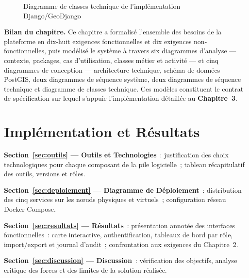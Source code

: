 \begin{figure}[H]
  \centering
  \caption{Diagramme de classes technique de l'implémentation Django/GeoDjango}
  \label{fig:diag-classes-tech}
\end{figure}

\medskip
\noindent\textbf{Bilan du chapitre.}
Ce chapitre a formalisé l'ensemble des besoins de la plateforme en
dix-huit exigences fonctionnelles et dix exigences non-fonctionnelles, puis
modélisé le système à travers six diagrammes d'analyse --- contexte,
packages, cas d'utilisation, classes métier et activité --- et cinq
diagrammes de conception --- architecture technique, schéma de données
PostGIS, deux diagrammes de séquence système, deux diagrammes de séquence
technique et diagramme de classes technique. Ces modèles constituent le
contrat de spécification sur lequel s'appuie l'implémentation détaillée au
\textbf{Chapitre~3}.

\clearpage

\chapter{Implémentation et Résultats}
\label{chap:implementation}

\begin{chapplan}
  \item \textbf{Section~\ref{sec:outils} --- Outils et Technologies}~:
    justification des choix technologiques pour chaque composant de la
    pile logicielle~; tableau récapitulatif des outils, versions et rôles.
  \item \textbf{Section~\ref{sec:deploiement} --- Diagramme de Déploiement}~:
    distribution des cinq services sur les nœuds physiques et virtuels~;
    configuration réseau Docker Compose.
  \item \textbf{Section~\ref{sec:resultats} --- Résultats}~:
    présentation annotée des interfaces fonctionnelles~: carte interactive,
    authentification, tableaux de bord par rôle, import/export et journal
    d'audit~; confrontation aux exigences du Chapitre~2.
  \item \textbf{Section~\ref{sec:discussion} --- Discussion}~:
    vérification des objectifs, analyse critique des forces et des limites
    de la solution réalisée.
\end{chapplan}

